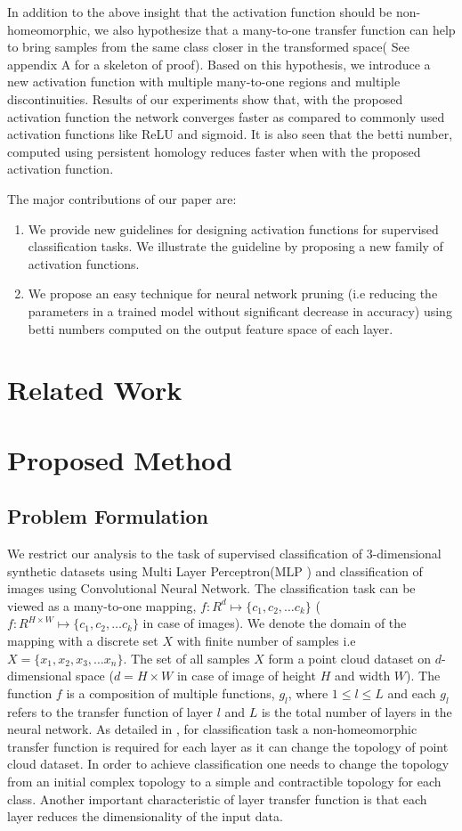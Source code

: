\documentclass{bmvc2k}
\begin{document}
In addition to the above insight that the activation function should be non-homeomorphic, we also hypothesize that a many-to-one transfer function can help to bring samples from the same class closer in the transformed space( See appendix A for a skeleton of proof). Based on this hypothesis, we introduce a new activation function with multiple many-to-one regions and multiple discontinuities. Results of our experiments show that, with the proposed activation function the network converges faster as compared to commonly used activation functions like ReLU and sigmoid. It is also seen that the betti number, computed using persistent homology \cite{naitzat2020topology} reduces faster when with the proposed activation function.

The major contributions of our paper are:
\begin{enumerate}
\item We provide new guidelines for designing  activation functions for supervised classification tasks. We illustrate the guideline by proposing a  new family of activation functions.
\item We propose an easy technique for neural network pruning (i.e reducing the parameters in a trained model without significant decrease in accuracy) using betti numbers computed on the output feature space of each layer.
\end{enumerate}

\section{Related Work}
\section{Proposed Method}
\subsection{Problem Formulation}
We restrict our analysis to the task of supervised classification of  $3$-dimensional synthetic datasets using Multi Layer Perceptron(MLP ) and classification of images using Convolutional Neural Network. The classification task can be viewed as a many-to-one mapping, $f:R^d \mapsto \{c_1, c_2, \ldots c_k\}$  ( $f:R^{H \times W} \mapsto \{c_1, c_2, \ldots c_k\}$  in case of images). We denote the domain of the mapping with a discrete set $X$ with finite number of samples i.e  $X = \{x_1, x_2, x_3,\ldots x_n\}$.
The set of all samples $X$ form a point cloud dataset on $d$-dimensional space ($d=H \times W$ in case of image of height $H$ and width $W$).
The function $f$ is a composition of multiple functions, $g_l$, where $1 \leq l \leq L $ and each $g_l$ refers to the transfer function of layer $l$ and $L$ is the total number of layers in the neural network. As detailed in \cite{naitzat2020topology},  for classification task a non-homeomorphic transfer function is required for each layer as it can change the topology of point cloud dataset. In order to achieve classification one needs to change the topology from an initial complex topology to a simple and contractible topology for each class. Another important characteristic of layer transfer function is that each layer reduces the dimensionality of the input data.
\end{document}
